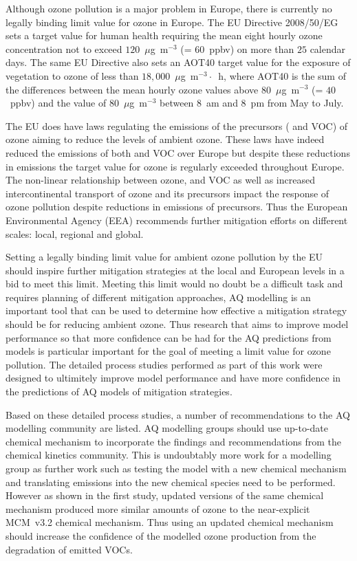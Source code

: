 Although ozone pollution is a major problem in Europe, there is currently no legally binding limit value for ozone in Europe.
The EU Directive 2008/50/EG sets a target value for human health requiring the mean eight hourly ozone concentration not to exceed $120$~$\mu$g~m$^{-3}$ (= $60$~ppbv) on more than $25$ calendar days.
The same EU Directive also sets an AOT40 target value for the exposure of vegetation to ozone of less than $18,000$~$\mu$g~m$^{-3} \cdot$~h, where AOT40 is the sum of the differences between the mean hourly ozone values above $80$~$\mu$g~m$^{-3}$ (= $40$~ppbv) and the value of $80$~$\mu$g~m$^{-3}$ between 8~am and 8~pm from May to July.

The EU does have laws regulating the emissions of the precursors ( and VOC) of ozone aiming to reduce the levels of ambient ozone.
These laws have indeed reduced the emissions of both  and VOC over Europe but despite these reductions in emissions the target value for ozone is regularly exceeded throughout Europe.
The non-linear relationship between ozone,  and VOC as well as increased intercontinental transport of ozone and its precursors impact the response of ozone pollution despite reductions in emissions of precursors.
Thus the European Environmental Agency (EEA) recommends further mitigation efforts on different scales: local, regional and global.

Setting a legally binding limit value for ambient ozone pollution by the EU should inspire further mitigation strategies at the local and European levels in a bid to meet this limit.
Meeting this limit would no doubt be a difficult task and requires planning of different mitigation approaches, AQ modelling is an important tool that can be used to determine how effective a mitigation strategy should be for reducing ambient ozone.
Thus research that aims to improve model performance so that more confidence can be had for the AQ predictions from models is particular important for the goal of meeting a limit value for ozone pollution.
The detailed process studies performed as part of this work were designed to ultimitely improve model performance and have more confidence in the predictions of AQ models of mitigation strategies.

Based on these detailed process studies, a number of recommendations to the AQ modelling community are listed.
AQ modelling groups should use up-to-date chemical mechanism to incorporate the findings and recommendations from the chemical kinetics community.
This is undoubtably more work for a modelling group as further work such as testing the model with a new chemical mechanism and translating emissions into the new chemical species need to be performed.
However as shown in the first study, updated versions of the same chemical mechanism produced more similar amounts of ozone to the near-explicit MCM~v3.2 chemical mechanism.
Thus using an updated chemical mechanism should increase the confidence of the modelled ozone production from the degradation of emitted VOCs.

